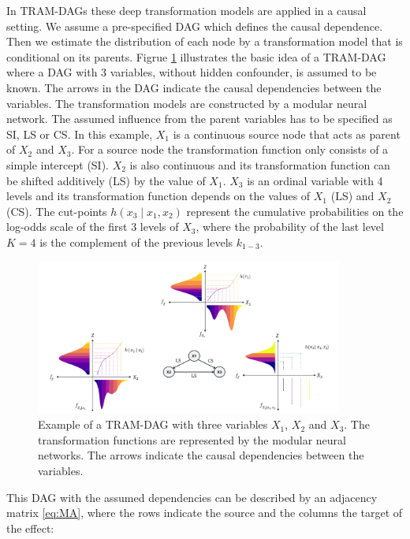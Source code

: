In TRAM-DAGs these deep transformation models are applied in a causal setting. We assume a pre-specified DAG which defines the causal dependence. Then we estimate the distribution of each node by a transformation model that is conditional on its parents. Figrue \ref{fig:tram_dag} illustrates the basic idea of a TRAM-DAG where a DAG with 3 variables, without hidden confounder, is assumed to be known. The arrows in the DAG indicate the causal dependencies between the variables. The transformation models are constructed by a modular neural network. The assumed influence from the parent variables has to be specified as SI, LS or CS. In this example, $X_1$ is a continuous source node that acts as parent of $X_2$ and $X_3$. For a source node the transformation function only consists of a simple intercept (SI). $X_2$ is also continuous and its transformation function can be shifted additively (LS) by the value of $X_1$. $X_3$ is an ordinal variable with 4 levels and its transformation function depends on the values of $X_1$ (LS) and $X_2$ (CS). The cut-points $h(x_3 \mid x_1, x_2)$ represent the cumulative probabilities on the log-odds scale of the first 3 levels of $X_3$, where the probability of the last level $K=4$ is the complement of the previous levels $k_{1-3}$.

\begin{figure}[H]
\centering
\includegraphics[width=0.9\textwidth]{img/tram_dag.png}
\caption{Example of a TRAM-DAG with three variables $X_1$, $X_2$ and $X_3$. The transformation functions are represented by the modular neural networks. The arrows indicate the causal dependencies between the variables.}
\label{fig:tram_dag}
\end{figure}

This DAG with the assumed dependencies can be described by an adjacency matrix \ref{eq:MA}, where the rows indicate the source and the columns the target of the effect: 


